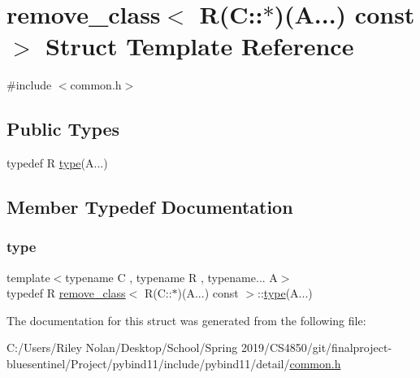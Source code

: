 \hypertarget{structremove__class_3_01_r_07_c_1_1_5_08_07_a_8_8_8_08_01const_01_4}{}\section{remove\+\_\+class$<$ R(C\+::$\ast$)(A...) const $>$ Struct Template Reference}
\label{structremove__class_3_01_r_07_c_1_1_5_08_07_a_8_8_8_08_01const_01_4}


{\ttfamily \#include $<$common.\+h$>$}

\subsection*{Public Types}
\begin{DoxyCompactItemize}
\item 
typedef R \mbox{\hyperlink{structremove__class_3_01_r_07_c_1_1_5_08_07_a_8_8_8_08_01const_01_4_a20fc37feb3ec89319bfdaf004273ee2d}{type}}(A...)
\end{DoxyCompactItemize}


\subsection{Member Typedef Documentation}
\mbox{\label{structremove__class_3_01_r_07_c_1_1_5_08_07_a_8_8_8_08_01const_01_4_a20fc37feb3ec89319bfdaf004273ee2d}} 
\subsubsection{\texorpdfstring{type}{type}}
{\footnotesize\ttfamily template$<$typename C , typename R , typename... A$>$ \\
typedef R \mbox{\hyperlink{structremove__class}{remove\+\_\+class}}$<$ R(C\+::$\ast$)(A...) const $>$\+::\mbox{\hyperlink{_s_d_l__opengl_8h_ad5ddf6fca7b585646515660e810e0188}{type}}(A...)}



The documentation for this struct was generated from the following file\+:\begin{DoxyCompactItemize}
\item 
C\+:/\+Users/\+Riley Nolan/\+Desktop/\+School/\+Spring 2019/\+C\+S4850/git/finalproject-\/bluesentinel/\+Project/pybind11/include/pybind11/detail/\mbox{\hyperlink{detail_2common_8h}{common.\+h}}\end{DoxyCompactItemize}
